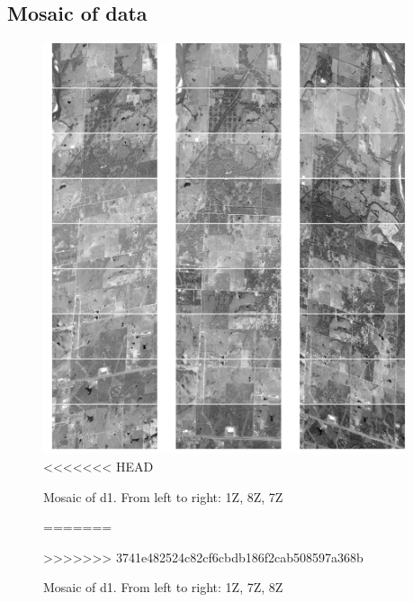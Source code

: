 \documentclass[paper=a4, fontsize=11pt, onecolumn, tikz, dvipsnames, svgnames, x11names]{article}
\begin{document}
\subsection{Mosaic of data}

\newpage
\begin{figure}
    \centering
    \includegraphics[width = 0.95\textwidth]{d1.png}
<<<<<<< HEAD
    \caption{Mosaic of d1. From left to right: 1Z, 8Z, 7Z}
    \label{fig_mosaic_d1}
=======
    \caption{Mosaic of d1. From left to right: 1Z, 7Z, 8Z}
    \label{}
>>>>>>> 3741e482524c82cf6cbdb186f2cab508597a368b
\end{figure}
\end{document}
